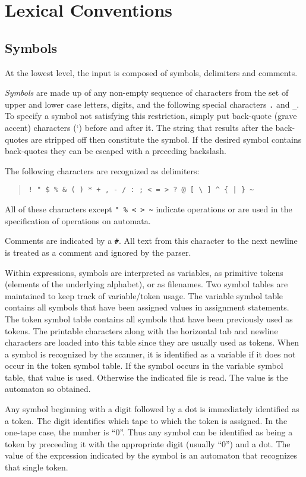 \section{Lexical Conventions}
\subsection{Symbols}
At the lowest level, the input is composed of symbols, delimiters and
comments.

{\em Symbols} are made up of any non-empty sequence of
characters from the set of upper and lower case letters,
digits, and the following special characters \verb#.# and \verb#_#.
To specify a symbol not satisfying this restriction, simply put back-quote
(grave accent) characters (`) before and after it.
The string that results after the back-quotes are stripped off then
constitute the symbol.
If the desired symbol contains back-quotes they can be escaped with a
preceding backslash.

The following characters are recognized as delimiters:
\begin{quote}
\begin{verbatim}
! " $ % & ( ) * + , - / : ; < = > ? @ [ \ ] ^ { | } ~
\end{verbatim}
\end{quote}
All of these characters except \verb#" % < > ~# indicate operations or are
used in the specification of operations on automata.

Comments are indicated by a \verb$#$.
All text from this character to the next newline is treated as a comment
and ignored by the parser.

Within expressions, symbols are interpreted as variables, as
primitive tokens (elements of the underlying alphabet), or as filenames.
Two symbol tables are maintained to keep track of variable/token usage.
The variable symbol table contains all symbols that have been assigned
values in assignment statements.
The token symbol table contains all symbols that have been previously used
as tokens.
The printable characters along with the horizontal tab and newline
characters are loaded into this table since they are usually used as tokens.
When a symbol is recognized by the scanner, it is identified as a variable
if it does not occur in the token symbol table.
If the symbol occurs in the variable symbol table, that value is used.
Otherwise the indicated file is read.
The value is the automaton so obtained.

Any symbol beginning with a digit followed by a dot is immediately
identified as a token.
The digit identifies which tape to which the token is assigned.
In the one-tape case, the number is ``0''.
Thus any symbol can be identified as being a token by preceeding it with
the appropriate digit (usually ``0'') and a dot.
The value of the expression indicated by the symbol is an automaton that
recognizes that single token.

